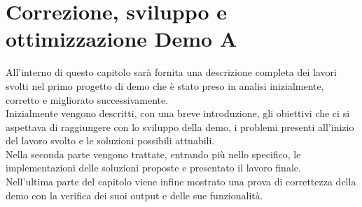 


\chapter{Correzione, sviluppo e ottimizzazione Demo A} \label{ch:DemoA}

All'interno di questo capitolo sarà fornita una descrizione completa dei lavori svolti nel primo progetto di demo che è stato preso in analisi inizialmente, corretto e migliorato successivamente.
\\ Inizialmente vengono descritti, con una breve introduzione, gli obiettivi che ci si aspettava di raggiungere con lo sviluppo della demo, i problemi presenti all'inizio del lavoro svolto e le soluzioni possibili attuabili.
\\ Nella seconda parte vengono trattate, entrando più nello specifico, le implementazioni delle soluzioni proposte e presentato il lavoro finale. 
\\ Nell'ultima parte del capitolo viene infine mostrato una prova di correttezza della demo con la verifica dei suoi output e delle sue funzionalità.


